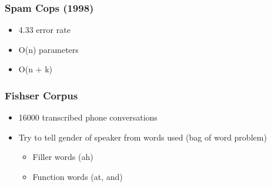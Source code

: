     \subsubsection{Spam Cops (1998)}

      \begin{itemize}
        \item 4.33 error rate
        \item O(n) parameters
        \item O(n + k)
      \end{itemize}

    \subsubsection{Fishser Corpus}

      \begin{itemize}
        \item 16000 transcribed phone conversations
        \item Try to tell gender of speaker from words used (bag of word problem)
        \begin{itemize}
          \item Filler words (ah)
          \item Function words (at, and)
        \end{itemize}
      \end{itemize}